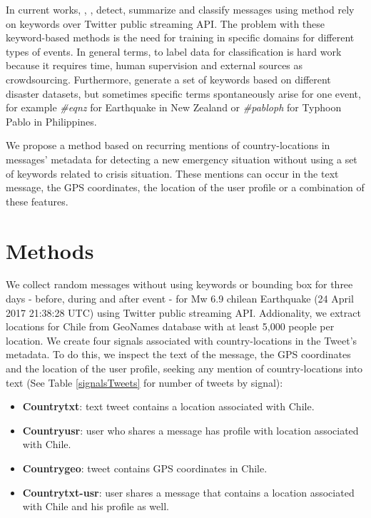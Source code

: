 \documentclass{ewic}
\begin{document}
In current works, \cite{ashktorab2014tweedr}, \cite{imranaidr2014}, \cite{kumar2011tweettracker} detect, summarize and classify messages using method rely on keywords over Twitter public streaming API. The problem with these keyword-based methods is the need for training in specific domains for different types of events. In general terms, to label data for classification is hard work because it requires time, human supervision and external sources as crowdsourcing. Furthermore, \cite{olteanu2014} generate a set of keywords based on different disaster datasets, but sometimes specific terms spontaneously arise for one event, for example \textit{\#eqnz} for Earthquake in New Zealand or \textit{\#pabloph} for Typhoon Pablo in Philippines.

We propose a method based on recurring mentions of country-locations in messages' metadata for detecting a new emergency situation without using a set of keywords related to crisis situation. These mentions can occur in the text message, the GPS coordinates, the location of the user profile or a combination of these features.


\section{Methods}
We collect random messages without using keywords or bounding box for three days - before, during and after event - for Mw 6.9 chilean Earthquake (24 April 2017 21:38:28 UTC) using Twitter public streaming API. Addionality, we extract locations for Chile from GeoNames database with at least 5,000 people per location. We create four signals associated with country-locations in the Tweet's metadata. To do this, we inspect the text of the message, the GPS coordinates and the location of the user profile, seeking any mention of country-locations into text (See Table \ref{signalsTweets} for number of tweets by signal):

\begin{itemize}
	\item \textbf{Countrytxt}: text tweet contains a location associated with Chile.
	\item \textbf{Countryusr}: user who shares a message has profile with location associated with Chile.
	\item \textbf{Countrygeo}: tweet contains GPS coordinates in Chile.
	\item \textbf{Countrytxt-usr}: user shares a message that contains a location associated with Chile and his profile as well.
\end{itemize}
\end{document}
